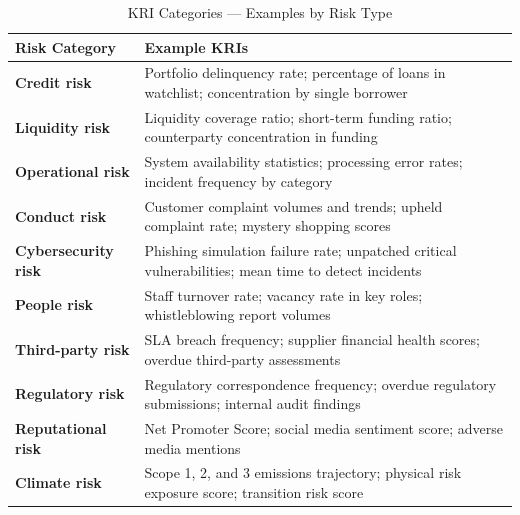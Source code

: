 \begin{table}[H]
  \centering
  \renewcommand{\arraystretch}{1.5}
  \begin{tabularx}{\textwidth}{ | >{\raggedright\arraybackslash}p{} 
                                | >{\raggedright\arraybackslash}X | }
    \hline
    \textbf{Risk Category} & \textbf{Example KRIs} \\
    \hline
    \textbf{Credit risk} & Portfolio delinquency rate; percentage of loans in watchlist; concentration by single borrower\\
    \hline
    \textbf{Liquidity risk} & Liquidity coverage ratio; short-term funding ratio; counterparty concentration in funding\\
    \hline
    \textbf{Operational risk} & System availability statistics; processing error rates; incident frequency by category\\
    \hline
    \textbf{Conduct risk} & Customer complaint volumes and trends; upheld complaint rate; mystery shopping scores\\
    \hline
    \textbf{Cybersecurity risk} & Phishing simulation failure rate; unpatched critical vulnerabilities; mean time to detect incidents\\
    \hline
    \textbf{People risk} & Staff turnover rate; vacancy rate in key roles; whistleblowing report volumes\\
    \hline
    \textbf{Third-party risk} & SLA breach frequency; supplier financial health scores; overdue third-party assessments\\
    \hline
    \textbf{Regulatory risk} & Regulatory correspondence frequency; overdue regulatory submissions; internal audit findings\\
    \hline
    \textbf{Reputational risk} & Net Promoter Score; social media sentiment score; adverse media mentions\\
    \hline
    \textbf{Climate risk} & Scope 1, 2, and 3 emissions trajectory; physical risk exposure score; transition risk score\\
    \hline
  \end{tabularx}
  \caption*{KRI Categories — Examples by Risk Type}
\end{table}

